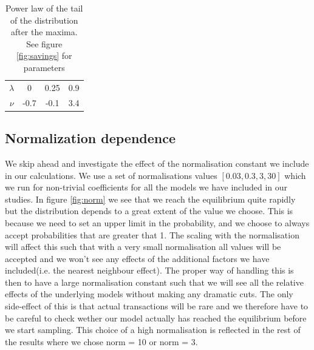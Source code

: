 \documentclass[a4paper,11pt]{article}
\begin{document}
{\begin{table}[h]
\caption{Power law of the tail of the distribution after the maxima. See figure \ref{fig:savings} for parameters}
\begin{center}
\begin{tabular}{c|c|c|c}
$\lambda$ & 0 & 0.25 & 0.9 \\
$\nu$ & -0.7 & -0.1 & 3.4
\end{tabular}
\end{center}
\label{tab:savings}
\end{table}%


\subsection{Normalization dependence}
We skip ahead and investigate the effect of the normalisation constant we include in our calculations. We use a set of normalisations values $[0.03,0.3,3,30]$ which we run for non-trivial coefficients for all the models we have included in our studies. In figure \ref{fig:norm} we see that we reach the equilibrium quite rapidly but the distribution depends to a great extent of the value we choose. This is because we need to set an upper limit in the probability, and we choose to always accept probabilities that are greater that 1. The scaling with the normalisation will affect this such that with a very small normalisation all values will be accepted and we won't see any effects of the additional factors we have included(i.e. the nearest neighbour effect). The proper way of handling this is then to have a large normalisation constant such that we will see all the relative effects of the underlying models without making any dramatic cuts. The only side-effect of this is that actual transactions will be rare and we therefore have to be careful to check wether our model actually has reached the equilibrium before we start sampling. This choice of a high normalisation is reflected in the rest of the results where we chose norm = 10 or norm = 3. 

}
\end{document}

